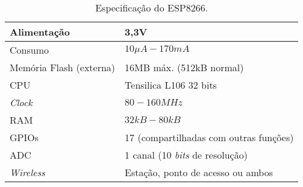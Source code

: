 \begin{table}[H]
    \centering
    \caption[Especificação do ESP8266]{Especificação do ESP8266.
    \label{tab:espec-microcontrolador}}
    \begin{tabular}{|l|l|}
    \hline
    Alimentação & 3,3V \\ \hline
    Consumo & $10 \mu A - 170mA$ \\ \hline
    Memória Flash (externa) & 16MB máx. (512kB normal) \\ \hline
    CPU & Tensilica L106 32 bits \\ \hline
    \emph{Clock} & $80 - 160MHz$ \\ \hline
    RAM & $32kB - 80kB$ \\ \hline
    GPIOs & 17 (compartilhadas com outras funções) \\ \hline
    ADC & 1 canal (10 \emph{bits} de resolução) \\ \hline
    \emph{Wireless} & Estação, ponto de acesso ou ambos \\ \hline
    \end{tabular}
\end{table}
